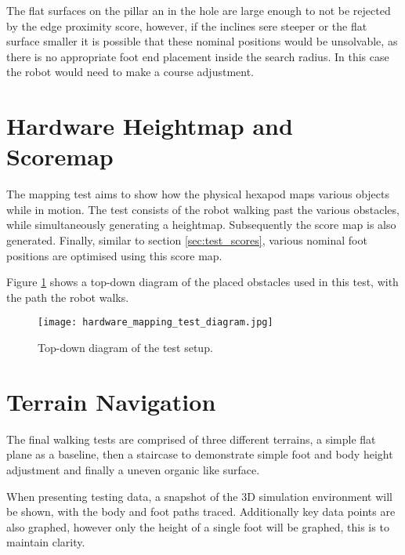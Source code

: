    The flat surfaces on the pillar an in the hole are large enough to not be rejected by the edge proximity score, however, if the inclines sere steeper or the flat surface smaller it is possible that these nominal positions would be
    unsolvable, as there is no appropriate foot end placement inside the search radius. In this case the robot would need to make a course adjustment.

\section{Hardware Heightmap and Scoremap}
    The mapping test aims to show how the physical hexapod maps various objects while in motion. The test consists of the robot walking past the
    various obstacles, while simultaneously generating a heightmap. Subsequently the score map is also generated. 
    Finally, similar to section \ref{sec:test_scores}, various nominal foot positions are optimised using this score map.
    
    Figure \ref{fig:hardware_map_diag} shows a top-down diagram of the placed obstacles used in this test, with the path the robot walks.
    \begin{figure}[h]
        \centering
        \texttt{[image: hardware\_mapping\_test\_diagram.jpg]}
        \caption{Top-down diagram of the test setup.}
        \label{fig:hardware_map_diag}
    \end{figure}

\newpage
\section{Terrain Navigation}
    The final walking tests are comprised of three different terrains, a simple flat plane as a baseline, then a staircase to demonstrate simple foot and body height adjustment and
    finally a uneven organic like surface.
    
    When presenting testing data, a snapshot of the 3D simulation environment will be shown, with the body and foot paths traced. Additionally key data points
    are also graphed, however only the height of a single foot will be graphed, this is to maintain clarity.

